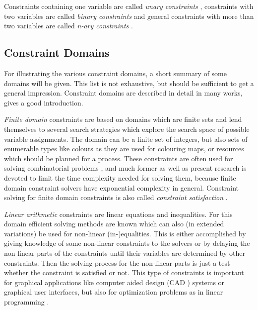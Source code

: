 Constraints containing one variable are called {\em unary
  constraints}%
%
, constraints with two variables are called
{\em binary constraints}%
%
 and general constraints with more than two
variables are called {\em n-ary constraints}%
%
.



\subsection{Constraint Domains}

For illustrating the various constraint domains, a short summary of
some domains will be given.  This list is not exhaustive, but should
be sufficient to get a general impression.  Constraint domains are
described in detail in many works,
\cite{marriot98programmingwithconstraints} gives a good introduction.

{\em Finite domain}%
 constraints are based on domains which are finite
sets%
 and lend themselves to several search strategies
which explore the search space of possible variable assignments.  The
domain can be a finite set of integers, but also sets of enumerable
types%
 like colours as they are used for colouring maps,
or resources which should be planned for a process.  These constraints
are often used for solving combinatorial problems%
, and much former as well as present research is
devoted to limit the time complexity needed for solving them, because
finite domain constraint solvers have exponential complexity in
general.  Constraint solving for finite domain constraints is also
called {\em constraint satisfaction}%
%
%
.

{\em Linear arithmetic}%
 constraints are linear equations and
inequalities.  For this domain efficient solving methods are known
which can also (in extended variations) be used for non-linear%
(in-)equalities.  This is either accomplished by giving knowledge of
some non-linear constraints to the solvers or by delaying the
non-linear parts of the constraints until their variables are
determined by other constraints.  Then the solving process for the
non-linear parts is just a test whether the constraint is satisfied or
not.  This type of constraints is important for graphical applications
like computer aided design%
 (CAD%
) systems or graphical user interfaces,
but also for optimization problems as in linear programming%
.

